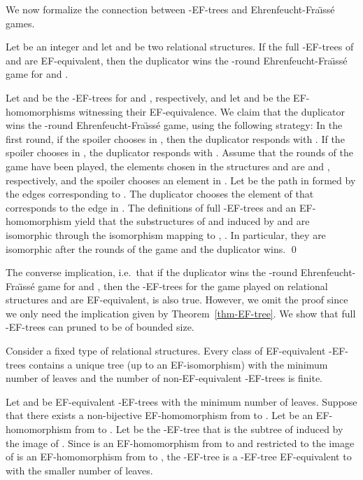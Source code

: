 \documentclass{CSML}
\theoremstyle{plain}\newtheorem{claim}[thm]{Claim}
\begin{document}
We now formalize the connection between -EF-trees and Ehrenfeucht-Fra{\"\i}ss\'e games. 

\begin{thm}
\label{thm-EF-tree}
Let  be an integer and let  and  be two relational structures.
If the full -EF-trees of  and  are EF-equivalent,
then the duplicator wins the -round Ehrenfeucht-Fra{\"\i}ss\'e game for  and .
\end{thm}

\proof
Let  and  be the -EF-trees for  and , respectively, and
let  and  be the EF-homomorphisms witnessing their EF-equivalence. We claim
that the duplicator wins the -round Ehrenfeucht-Fra{\"\i}ss\'e game, using the following strategy:
In the first round, if the spoiler chooses  in ,
then the duplicator responds with .
If the spoiler chooses  in , the duplicator responds with .
Assume that the  rounds of the game have been played,
the elements chosen in the structures  and  are  and , respectively, and
the spoiler chooses an element  in .
Let  be the path in  formed by the edges corresponding to .
The duplicator chooses the element  of  that corresponds to the edge  in .
The definitions of full -EF-trees and an EF-homomorphism yield that
the substructures of  and  induced by  and  are isomorphic
through the isomorphism mapping  to , .
In particular, they are isomorphic after the  rounds of the game and
the duplicator wins.
\qed

The converse implication, i.e.~that if the duplicator wins the -round Ehren\-feucht-Fra{\"\i}ss\'e game for  and ,
then the -EF-trees for the game played on relational structures  and  are EF-equivalent, is also true.
However, we omit the proof since we only need the implication given by Theorem~\ref{thm-EF-tree}.
We show that full -EF-trees can pruned to be of bounded size.

\begin{lem}
\label{lem:prune}
Consider a fixed type of relational structures.
Every class of EF-equivalent -EF-trees contains a unique tree (up to an EF-isomorphism) with the minimum number of leaves and
the number of non-EF-equivalent -EF-trees is finite.
\end{lem}

\proof
Let  and  be EF-equivalent -EF-trees with the minimum number of leaves.
Suppose that there exists a non-bijective EF-homomorphism  from  to .
Let  be an EF-homomorphism from  to .
Let  be the -EF-tree that is the subtree of  induced by the image of .
Since  is an EF-homomorphism from  to  and
 restricted to the image of  is an EF-homomorphism from  to ,
the -EF-tree  is a -EF-tree EF-equivalent to  with the smaller number of leaves.
\end{document}
